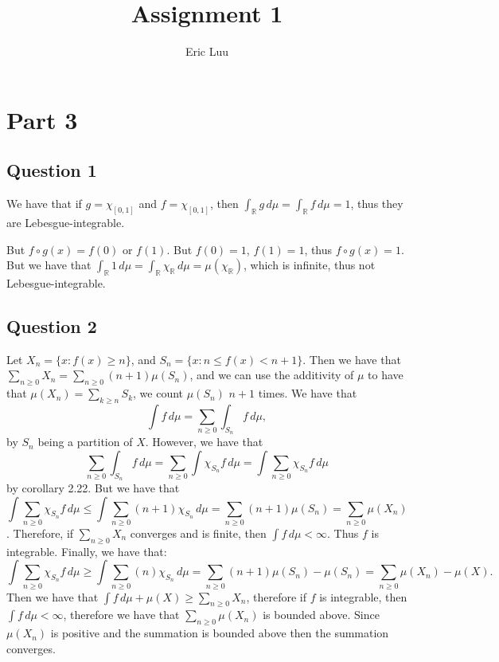 \documentclass{article}
\title{Assignment 1}
\author{Eric Luu}
\theoremstyle{definition}
\numberwithin{theorem}{section}
\numberwithin{equation}{section}
\newcommand{\intd}{\, d}
\begin{document}
\maketitle
\section*{Part 3}
\subsection*{Question 1}
We have that if $g = \chi_{[0, 1]}$ and $f = \chi_{[0, 1]}$, then $\int_\mathbb{R} g \intd \mu = \int_\mathbb{R} f \intd \mu = 1$, thus they are Lebesgue-integrable.  

But $f \circ g(x) = f(0)$ or $f(1)$. But $f(0) = 1$, $f(1) = 1$, thus $f \circ g(x) = 1$. But we have that $\int_\mathbb{R} 1 \intd \mu = \int_\mathbb{R} \chi_{\mathbb{R}} \intd \mu = \mu(\chi_{\mathbb{R}})$, which is infinite, thus not Lebesgue-integrable. 
\subsection*{Question 2}
Let $X_n = \lbrace x : f(x) \geq n \rbrace$, and $S_n = \lbrace x : n \leq f(x) < n + 1 \rbrace$. Then we have that $\sum_{n \geq 0} X_n = \sum_{n \geq 0} (n + 1) \mu(S_n)$, and we can use the additivity of $\mu$ to have that $\mu(X_n) = \sum_{k \geq n} S_k$, we count $\mu(S_n)$ $n + 1$ times. We have that
\begin{equation}
	\int f \intd \mu = \sum_{n \geq 0} \int_{S_n} f \intd \mu,
\end{equation} by $S_n$ being a partition of $X$. 
However, we have that 
\begin{equation}
	\sum_{n \geq 0} \int_{S_n} f \intd \mu = \sum_{n \geq 0} \int \chi_{S_n} f \intd \mu =  \int \sum_{n \geq 0}  \chi_{S_n} f \intd \mu
\end{equation} 
by corollary 2.22.  But we have that
\begin{equation}
	\int \sum_{n \geq 0}  \chi_{S_n} f \intd \mu \leq \int \sum_{n \geq 0} (n + 1)\chi_{S_n} \intd \mu = \sum_{n \geq 0} (n + 1)\mu(S_n) = \sum_{n \geq 0} \mu(X_n)
\end{equation}. Therefore, if $\sum_{n \geq 0} X_n$ converges and is finite, then $\int f \intd \mu < \infty$. Thus $f$ is integrable. 
Finally, we have that:
\begin{equation}
	\int \sum_{n \geq 0}  \chi_{S_n} f \intd \mu \geq \int \sum_{n \geq 0} (n)\chi_{S_n} \intd \mu = \sum_{n \geq 0} (n + 1)\mu(S_n) - \mu(S_n) = \sum_{n \geq 0}\mu(X_n) - \mu(X).
\end{equation}
Then we have that $\int f \intd \mu + \mu(X) \geq \sum_{n \geq 0} X_n$, therefore if $f$ is integrable, then $\int f \intd \mu < \infty$, therefore we have that $\sum_{n \geq 0} \mu(X_n)$ is bounded above. Since $\mu(X_n)$ is positive and the summation is bounded above then the summation converges. 
\end{document}
